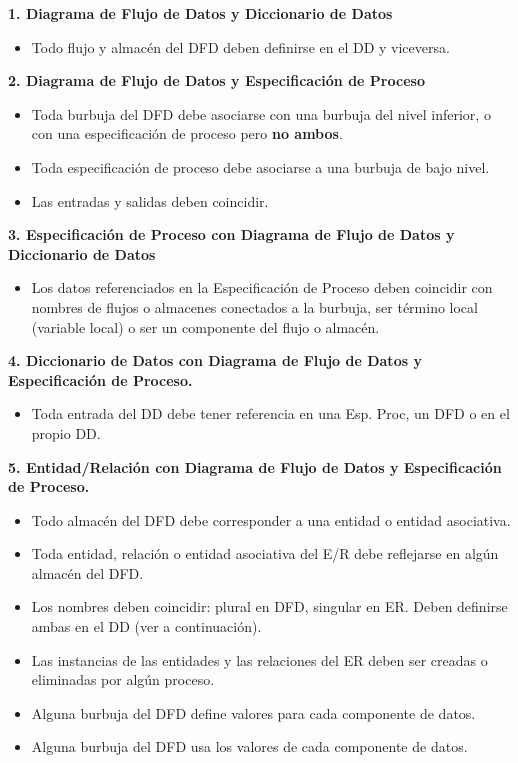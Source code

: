 \textbf{1. Diagrama de Flujo de Datos y Diccionario de Datos}

\begin{itemize}[noitemsep]
\item Todo flujo y almacén del DFD deben definirse en el DD y viceversa.
\end{itemize}

\textbf{2. Diagrama de Flujo de Datos y Especificación de Proceso}

\begin{itemize}[noitemsep]
\item Toda burbuja del DFD debe asociarse con una burbuja del nivel inferior, o con una especificación de proceso pero \textbf{no ambos}.
\item Toda especificación de proceso debe asociarse a una burbuja de bajo nivel.
\item Las entradas y salidas deben coincidir.
\end{itemize}

\textbf{3. Especificación de Proceso con Diagrama de Flujo de Datos y Diccionario de Datos}

\begin{itemize}[noitemsep]
\item Los datos referenciados en la Especificación de Proceso deben coincidir con nombres de flujos o almacenes conectados a la burbuja, ser término local (variable local) o ser un componente del flujo o almacén.
\end{itemize}

\textbf{4. Diccionario de Datos con Diagrama de Flujo de Datos y Especificación de Proceso.}

\begin{itemize}[noitemsep]
\item Toda entrada del DD debe tener referencia en una Esp. Proc, un DFD o en el propio DD.
\end{itemize}

\textbf{5. Entidad/Relación con Diagrama de Flujo de Datos y Especificación de Proceso.}

\begin{itemize}[noitemsep]
\item Todo almacén del DFD debe corresponder a una entidad o entidad asociativa.
\item Toda entidad, relación o entidad asociativa del E/R debe reflejarse en algún almacén del DFD.
\item Los nombres deben coincidir: plural en DFD, singular en ER. Deben definirse ambas en el DD (ver a continuación).
\item Las instancias de las entidades y las relaciones del ER deben ser creadas o eliminadas por algún proceso.
\item Alguna burbuja del DFD define valores para cada componente de datos.
\item Alguna burbuja del DFD usa los valores de cada componente de datos.
\end{itemize}

